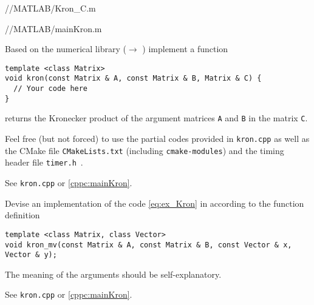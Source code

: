 \begin{problem}
\begin{subproblem}[2]
\begin{solution}

{\problems/\chpt/MATLAB/Kron_C.m}

{\problems/\chpt/MATLAB/mainKron.m}

\end{solution}
\end{subproblem}

\begin{subproblem}[2] \label{subprb:Kron_6}
  Based on the \eigen{} numerical library ($\to$ ) implement a
  \Cpp{} function 
\begin{lstlisting}[style=cppsimple]
template <class Matrix>
void kron(const Matrix & A, const Matrix & B, Matrix & C) {
  // Your code here
}
\end{lstlisting}
returns the Kronecker product of the argument matrices \texttt{A} and \texttt{B}
in the matrix \texttt{C}. 

\begin{hint}
  Feel free (but not forced) to use the partial codes provided in \verb|kron.cpp| as well as the CMake file \verb|CMakeLists.txt| (including \verb|cmake-modules|) and the timing header file \verb|timer.h|~.
\end{hint}

\begin{solution}
    See \texttt{kron.cpp} or \cref{cppc:mainKron}.
\end{solution}
\end{subproblem}

\begin{subproblem}[2] \label{subprb:Kron_7}
  Devise an implementation of the \matlab{} code \eqref{eq:ex_Kron} in \Cpp according
  to the function definition
  \begin{lstlisting}[style=cppsimple]
template <class Matrix, class Vector>
void kron_mv(const Matrix & A, const Matrix & B, const Vector & x, Vector & y);
  \end{lstlisting}
  The meaning of the arguments should be self-explanatory. 

  \begin{solution}
    See \texttt{kron.cpp} or \cref{cppc:mainKron}.
  \end{solution}
\end{subproblem}


\end{problem}
